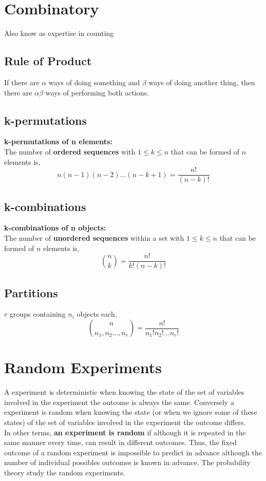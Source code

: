 \section{Combinatory}
Also know as expertise in counting

\subsection{Rule of Product}
If there are $\alpha$ ways of doing something and $\beta$ ways of doing another
thing, then there are $\alpha\beta$ ways of performing both actions.

\subsection{k-permutations}
\textbf{k-permutations of n elements:}\\
The number of \textbf{ordered sequences} with $1\leq k \leq n$ that can be
formed of $n$ elements is,
\[ n(n-1)(n-2)\dots(n-k+1) = \frac{n!}{(n-k)!} \]

\subsection{k-combinations}
\textbf{k-combinations of n objects:}\\
The number of \textbf{unordered sequences} within a set with $1\leq k \leq n$
that can be formed of $n$ elements is,
\[ \binom{n}{k} = \frac{n!}{k!(n-k)!} \]

\subsection{Partitions}
$r$ groups containing $n_i$ objects each,
\[ \binom{n}{n_1,n_2\dots,n_r} = \frac{n!}{n_1!n_2!\dots n_r!} \]

\section{Random Experiments}
 A experiment is deterministic when knowing the state of the set of variables
 involved in the experiment the outcome is always the same. Conversely a
 experiment is random when knowing the state (or when we ignore some of these
 states) of the set of variables involved in the experiment the outcome differs.
 \\
 
 In other terms, \textbf{an experiment is random} if although it is repeated in
 the same manner every time, can result in different outcomes. Thus, the fixed
 outcome of a random experiment is impossible to predict in advance although the
 number of individual possibles outcomes is known in advance. The probability
 theory study the random experiments.\\

